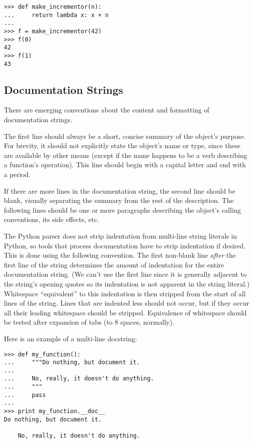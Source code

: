 \documentclass{manual}
\begin{document}
\begin{verbatim}
>>> def make_incrementor(n):
...     return lambda x: x + n
...
>>> f = make_incrementor(42)
>>> f(0)
42
>>> f(1)
43
\end{verbatim}


\subsection{Documentation Strings \label{docstrings}}

There are emerging conventions about the content and formatting of
documentation strings.

The first line should always be a short, concise summary of the
object's purpose.  For brevity, it should not explicitly state the
object's name or type, since these are available by other means
(except if the name happens to be a verb describing a function's
operation).  This line should begin with a capital letter and end with
a period.

If there are more lines in the documentation string, the second line
should be blank, visually separating the summary from the rest of the
description.  The following lines should be one or more paragraphs
describing the object's calling conventions, its side effects, etc.

The Python parser does not strip indentation from multi-line string
literals in Python, so tools that process documentation have to strip
indentation if desired.  This is done using the following convention.
The first non-blank line \emph{after} the first line of the string
determines the amount of indentation for the entire documentation
string.  (We can't use the first line since it is generally adjacent
to the string's opening quotes so its indentation is not apparent in
the string literal.)  Whitespace ``equivalent'' to this indentation is
then stripped from the start of all lines of the string.  Lines that
are indented less should not occur, but if they occur all their
leading whitespace should be stripped.  Equivalence of whitespace
should be tested after expansion of tabs (to 8 spaces, normally).

Here is an example of a multi-line docstring:

\begin{verbatim}
>>> def my_function():
...     """Do nothing, but document it.
... 
...     No, really, it doesn't do anything.
...     """
...     pass
... 
>>> print my_function.__doc__
Do nothing, but document it.

    No, really, it doesn't do anything.
    
\end{verbatim}
\end{document}
